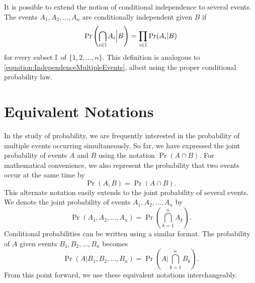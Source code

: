 It is possible to extend the notion of conditional independence to several events.
The events $A_1, A_2, \ldots, A_n$ are conditionally independent given $B$ if
\begin{equation*}
\Pr \left( \bigcap_{i \in \mathbb{I}} A_i \Big| B \right)
= \prod_{i \in \mathbb{I}} \Pr (A_i | B)
\end{equation*}
for every subset $\mathbb{I}$ of $\{1, 2, \ldots, n\}$.
This definition is analogous to \eqref{equation:IndependenceMultipleEvents}, albeit using the proper conditional probability law.


\section{Equivalent Notations}

In the study of probability, we are frequently interested in the probability of multiple events occurring simultaneously.
So far, we have expressed the joint probability of events $A$ and $B$ using the notation $\Pr (A \cap B)$.
For mathematical convenience, we also represent the probability that two events occur at the same time by
\begin{equation*}
\Pr (A, B) = \Pr (A \cap B) .
\end{equation*}
This alternate notation easily extends to the joint probability of several events.
We denote the joint probability of events $A_1, A_2, \ldots, A_n$ by
\begin{equation*}
\Pr (A_1, A_2, \ldots, A_n) =
\Pr \left( \bigcap_{k=1}^n A_k \right) .
\end{equation*}
Conditional probabilities can be written using a similar format.
The probability of $A$ given events $B_1, B_2, \ldots, B_n$ becomes
\begin{equation*}
\Pr (A | B_1, B_2, \ldots, B_n) =
\Pr \left( A \bigg| \bigcap_{k=1}^n B_k \right) .
\end{equation*}
From this point forward, we use these equivalent notations interchangeably.
